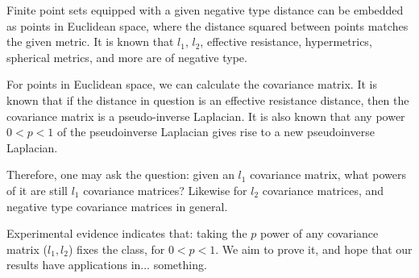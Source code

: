 Finite point sets equipped with a given negative type distance can be
embedded as points in Euclidean space, where the distance squared
between points matches the given metric. It is known that $l_1$,
$l_2$, effective resistance, hypermetrics, spherical metrics, and
more are of negative type.

For points in Euclidean space, we can calculate the covariance
matrix. It is known that if the distance in question is an
effective resistance distance, then the covariance matrix is a
pseudo-inverse Laplacian. It is also known that any power $0 < p < 1$
of the pseudoinverse Laplacian gives rise to a new pseudoinverse
Laplacian. 

Therefore, one may ask the question: 
given an $l_1$ covariance matrix, what
powers of it are still $l_1$ covariance matrices? Likewise for
$l_2$ covariance matrices, and negative type covariance matrices
in general.

Experimental evidence indicates that: taking the $p$ power of
any covariance matrix ($l_1, l_2$) fixes the class, for $0 < p <
1$. We aim to prove it, and hope that our results have
applications in... something.
